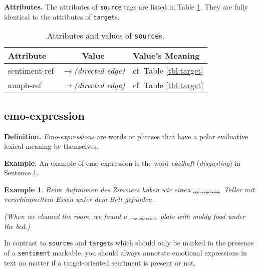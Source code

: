 \documentclass[11pt,a4paper]{article}
\newlength{\clmnwidth}
\theoremstyle{mytheoremstyle}
\newtheorem{exmp}{Example}[section]
\newcommand{\mtag}[2]{{\upshape[\emph{#2}\upshape]$_{\textrm{\bfseries\emph{\tiny
        #1}}}$}}
\newcommand{\emoexpression}[2][]{\mtag{emo-\-ex\-pression\ifstrempty{#1}{}{:#1}}{#2}}
\begin{document}
\noindent\textbf{Attributes.} The attributes of \texttt{source} tags are
listed in Table \ref{tbl:source}.  They are fully identical to the attributes
of \texttt{target}s.
\begin{center}
  \begin{table}[h]
    \caption{Attributes and values of \texttt{source}s.}
    \begin{tabular}{|l|c|p{0.935\clmnwidth}|}\hline
      Attribute & Value & Value's Meaning\\\hline

      sentiment-ref & \textit{$\longrightarrow$\newline(directed
        edge)} & cf. Table \ref{tbl:target}\\\hline

      anaph-ref & \textit{$\longrightarrow$\newline(directed edge)} &
      cf. Table \ref{tbl:target}\\\hline
    \end{tabular}\label{tbl:source}
  \end{table}
\end{center}

\subsection{emo-expression}
\noindent\textbf{Definition.} \emph{Emo-expressions} are words or phrases that
have a polar evaluative lexical meaning by themselves.

\noindent\textbf{Example.} An example of emo-expression is the word
\textit{ekelhaft} (\textit{disgusting}) in Sentence \ref{exmp:emo-expr1}.
\begin{exmp}
  Beim Aufr\"aumen des Zimmers haben wir einen
  \emoexpression{ekelhaften} Teller mit verschimmeltem Essen unter dem
  Bett gefunden.

  (When we cleaned the room, we found a \emoexpression{disgusting}
  plate with moldy food under the bed.)\label{exmp:emo-expr1}
\end{exmp}

In contrast to \texttt{source}s and \texttt{target}s which should only be
marked in the presence of a \texttt{sentiment} markable, you should always
annotate emotional expressions in text no matter if a target-oriented
sentiment is present or not.
\end{document}

